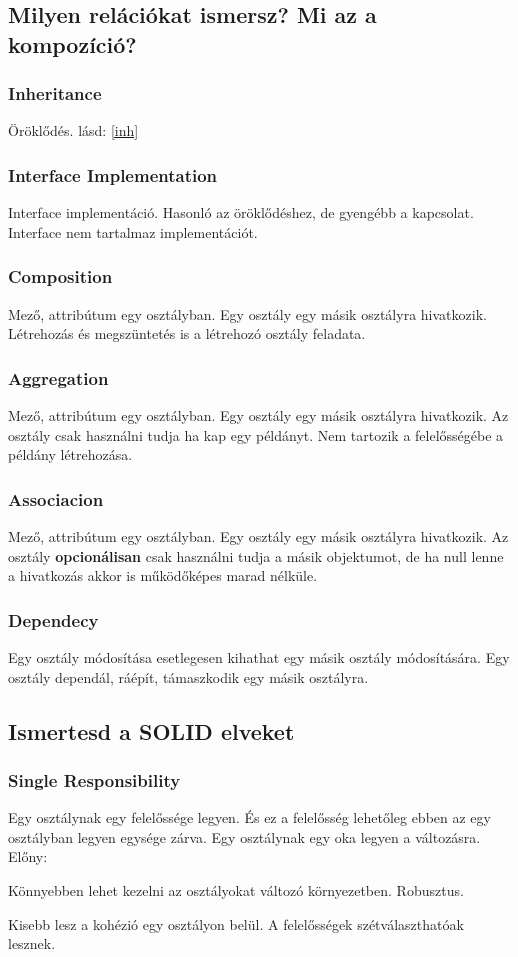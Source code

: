 \documentclass[a4paper,14pt]{extarticle}
\begin{document}
		\subsection{Milyen relációkat ismersz? Mi az a kompozíció?}
			\subsubsection{Inheritance} 
			Öröklődés. lásd: \ref{inh}
			\subsubsection{Interface Implementation}
			Interface implementáció. Hasonló az öröklődéshez, de gyengébb a kapcsolat. Interface nem tartalmaz implementációt.
			\subsubsection{Composition}
			Mező, attribútum egy osztályban. Egy osztály egy másik osztályra hivatkozik.
			Létrehozás és megszüntetés is a létrehozó osztály feladata.
			\subsubsection{Aggregation}	
			Mező, attribútum egy osztályban. Egy osztály egy másik osztályra hivatkozik.
			Az osztály csak használni tudja ha kap egy példányt. Nem tartozik a felelősségébe a példány létrehozása.
			\subsubsection{Associacion}
			Mező, attribútum egy osztályban. Egy osztály egy másik osztályra hivatkozik.
			Az osztály \textbf{opcionálisan} csak használni tudja a másik objektumot, de ha null lenne a hivatkozás akkor is működőképes marad nélküle.
			\subsubsection{Dependecy}
			Egy osztály módosítása esetlegesen kihathat egy másik osztály módosítására. Egy osztály dependál, ráépít, támaszkodik egy másik osztályra.
			
		\subsection{Ismertesd a SOLID elveket}
			\subsubsection{{\Large S}ingle Responsibility} 
			Egy osztálynak egy felelőssége legyen. És ez a felelősség lehetőleg ebben az egy osztályban legyen egysége zárva.
			\newline
			Egy osztálynak egy oka legyen a változásra.
			\newline
			Előny:
			\begin{compactitem}
				\item Könnyebben lehet kezelni az osztályokat változó környezetben. Robusztus.
				\item Kisebb lesz a kohézió egy osztályon belül. A felelősségek szétválaszthatóak lesznek. 
			\end{compactitem}
		
\end{document}
